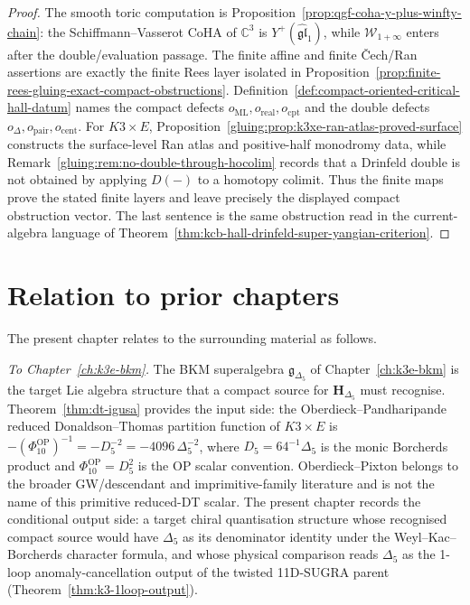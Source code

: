 \begin{proof}
The smooth toric computation is
Proposition~\ref{prop:qgf-coha-y-plus-winfty-chain}: the
Schiffmann--Vasserot CoHA of \(\mathbb{C}^3\) is
\(Y^+(\widehat{\mathfrak{gl}}_1)\), while
\(\mathcal{W}_{1+\infty}\) enters after the double/evaluation passage.
The finite affine and finite \v{C}ech/Ran assertions are exactly the
finite Rees layer isolated in
Proposition~\ref{prop:finite-rees-gluing-exact-compact-obstructions}.
Definition~\ref{def:compact-oriented-critical-hall-datum} names the
compact defects \(o_{\mathrm{ML}},o_{\mathrm{real}},o_{\mathrm{cpt}}\)
and the double defects \(o_{\Delta},o_{\mathrm{pair}},o_{\mathrm{cent}}\).
For \(K3\times E\), Proposition~\ref{gluing:prop:k3xe-ran-atlas-proved-surface}
constructs the surface-level Ran atlas and positive-half monodromy data,
while Remark~\ref{gluing:rem:no-double-through-hocolim} records that a
Drinfeld double is not obtained by applying \(D(-)\) to a homotopy colimit.
Thus the finite maps prove the stated finite layers and leave precisely
the displayed compact obstruction vector. The last sentence is the same
obstruction read in the current-algebra language of
Theorem~\ref{thm:kcb-hall-drinfeld-super-yangian-criterion}.
\end{proof}

\section{Relation to prior chapters}
\label{sec:k3-platonic-relations}

The present chapter relates to the surrounding material as follows.

\emph{To Chapter~\ref{ch:k3e-bkm}.} The BKM superalgebra $\mathfrak{g}_{\Delta_5}$ of
Chapter~\ref{ch:k3e-bkm} is the target Lie algebra structure that a compact
source for $\mathbf{H}_{\Delta_5}$ must recognise. Theorem~\ref{thm:dt-igusa}
provides the input side: the Oberdieck--Pandharipande reduced
Donaldson--Thomas partition function of \(K3\times E\) is
\(-(\Phi_{10}^{\mathrm{OP}})^{-1}=-D_5^{-2}=-4096\,\Delta_5^{-2}\),
where \(D_5=64^{-1}\Delta_5\) is the monic Borcherds product and
\(\Phi_{10}^{\mathrm{OP}}=D_5^2\) is the OP scalar convention.
Oberdieck--Pixton belongs to the
broader GW/descendant and imprimitive-family literature and is not the
name of this primitive reduced-DT scalar. The present chapter records the
conditional output side: a target chiral quantisation structure whose
recognised compact source would have \(\Delta_5\) as its denominator
identity under the Weyl--Kac--Borcherds character formula, and whose
physical comparison reads \(\Delta_5\) as the 1-loop anomaly-cancellation
output of the twisted 11D-SUGRA parent (Theorem~\ref{thm:k3-1loop-output}).

